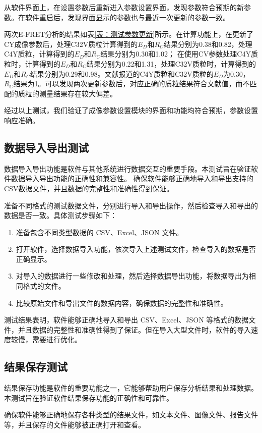 从软件界面上，在设置参数后重新进入参数设置界面，发现参数符合预期的新参数。在软件重启后，发现界面显示的参数也与最近一次更新的参数一致。

两次E-FRET分析的结果如表\ref{表：测试参数更新}所示。在计算功能上，在更新了CY成像参数后，处理C32V质粒计算得到的$E_D$和$R_C$结果分别为0.38和0.82，处理C4Y质粒，计算得到的$E_D$和$R_C$结果分别为0.30和1.02；
在使用CV参数处理C4Y质粒时，计算得到的$E_D$和$R_C$结果分别为0.22和1.31，处理C32V质粒时，计算得到的$E_D$和$R_C$结果分别为0.29和0.98。文献报道的C4Y质粒和C32V质粒的$E_D$为0.30，$R_C$结果为1。可以发现两次更新参数后，对应正确的质粒结果符合文献值，而不匹配的质粒的测量结果存在较大偏差。

经过以上测试，我们验证了成像参数设置模块的界面和功能均符合预期，参数设置响应准确。

\subsection{数据导入导出测试}
数据导入导出功能是软件与其他系统进行数据交互的重要手段。本测试旨在验证软件数据导入导出功能的正确性和兼容性。
确保软件能够正确地导入和导出支持的CSV数据文件，并且数据的完整性和准确性得到保证。

准备不同格式的测试数据文件，分别进行导入和导出操作，然后检查导入和导出的数据是否一致。具体测试步骤如下：
\begin{enumerate}
    \item 准备包含不同类型数据的 CSV、Excel、JSON 文件。
    \item 打开软件，选择数据导入功能，依次导入上述测试文件，检查导入的数据是否正确显示。
    \item 对导入的数据进行一些修改和处理，然后选择数据导出功能，将数据导出为相同格式的文件。
    \item 比较原始文件和导出文件的数据内容，确保数据的完整性和准确性。
\end{enumerate}

测试结果表明，软件能够正确地导入和导出 CSV、Excel、JSON 等格式的数据文件，并且数据的完整性和准确性得到了保证。但在导入大型文件时，软件的导入速度较慢，需要进行优化。

\subsection{结果保存测试}
结果保存功能是软件的重要功能之一，它能够帮助用户保存分析结果和处理数据。本测试旨在验证软件结果保存功能的正确性和可靠性。

确保软件能够正确地保存各种类型的结果文件，如文本文件、图像文件、报告文件等，并且保存的文件能够被正确打开和查看。

